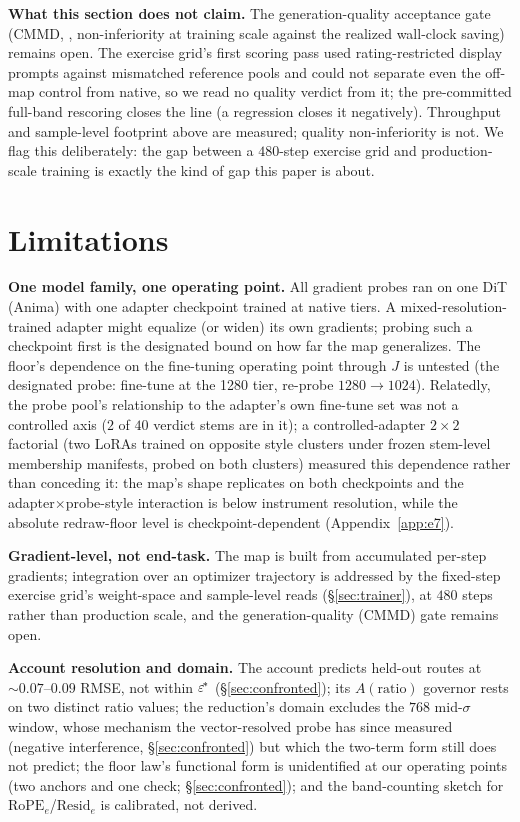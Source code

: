 \textbf{What this section does not claim.} The generation-quality
acceptance gate (CMMD, \citealp{jayasumana2024cmmd}, non-inferiority
at training scale against the realized wall-clock saving) remains
open. The exercise grid's first scoring pass used rating-restricted
display prompts against mismatched reference pools and could not
separate even the off-map control from native, so we read no quality
verdict from it; the pre-committed full-band rescoring closes the line
(a regression closes it negatively). Throughput and sample-level
footprint above are measured; quality non-inferiority is not. We flag
this deliberately: the gap between a $480$-step exercise grid and
production-scale training is exactly the kind of gap this paper is
about.

\section{Limitations}
\label{sec:limitations}

\textbf{One model family, one operating point.} All gradient probes ran on
one DiT (Anima) with one adapter checkpoint trained at native tiers. A
mixed-resolution-trained adapter might equalize (or widen) its own
gradients; probing such a checkpoint first is the designated bound on how
far the map generalizes. The floor's dependence on the fine-tuning
operating point through $J$ is untested (the designated probe: fine-tune
at the 1280 tier, re-probe $1280{\to}1024$). Relatedly, the probe pool's
relationship to the adapter's own fine-tune set was not a controlled
axis ($2$ of $40$ verdict stems are in it); a controlled-adapter
$2{\times}2$ factorial (two LoRAs trained on opposite style clusters
under frozen stem-level membership manifests, probed on both clusters)
measured this dependence rather than conceding it: the map's shape
replicates on both checkpoints and the adapter$\times$probe-style
interaction is below instrument resolution, while the absolute
redraw-floor level is checkpoint-dependent
(Appendix~\ref{app:e7}).

\textbf{Gradient-level, not end-task.} The map is built from accumulated
per-step gradients; integration over an optimizer trajectory is
addressed by the fixed-step exercise grid's weight-space and
sample-level reads (\S\ref{sec:trainer}), at $480$ steps rather than
production scale, and the generation-quality (CMMD) gate remains
open.

\textbf{Account resolution and domain.} The account predicts held-out
routes at ${\sim}0.07$--$0.09$ RMSE, not within $\varepsilon^{\!*}$
(\S\ref{sec:confronted}); its $A(\mathrm{ratio})$ governor rests on two
distinct ratio values; the reduction's domain excludes the $768$
mid-$\sigma$ window, whose mechanism the vector-resolved probe has
since measured (negative interference, \S\ref{sec:confronted}) but
which the two-term form still does not predict; the
floor law's functional form is unidentified at our operating points
(two anchors and one check; \S\ref{sec:confronted}); and the
band-counting sketch for $\mathrm{RoPE}_e$/$\mathrm{Resid}_e$ is
calibrated, not derived.

